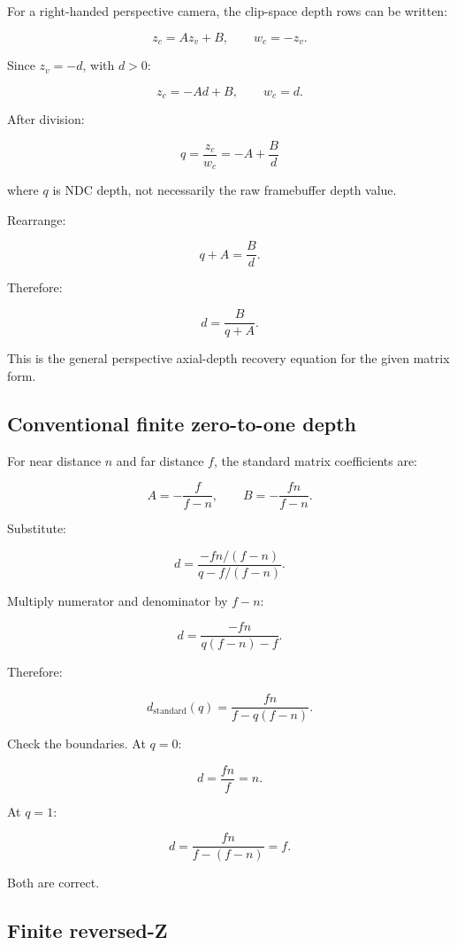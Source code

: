 \hypertarget{02-foundations-ii-ch035-start-from-the-perspective-matrix}{}

For a right-handed perspective camera, the clip-space depth rows can be written:

\[ z_c=Az_v+B, \qquad w_c=-z_v. \]

Since \(z_v=-d\), with \(d>0\):

\[ z_c=-Ad+B, \qquad w_c=d. \]

After division:

\[ \boxed{ q=\frac{z_c}{w_c}=-A+\frac Bd } \]

where \(q\) is NDC depth, not necessarily the raw framebuffer depth value.

Rearrange:

\[ q+A=\frac Bd. \]

Therefore:

\[ \boxed{ d=\frac B{q+A}. } \]

This is the general perspective axial-depth recovery equation for the given matrix form.

\subsection{Conventional finite zero-to-one depth}\label{02-foundations-ii-ch035-conventional-finite-zero-to-one-depth}

\hypertarget{02-foundations-ii-ch035-conventional-finite-zero-to-one-depth}{}

For near distance \(n\) and far distance \(f\), the standard matrix coefficients are:

\[ A=-\frac f{f-n}, \qquad B=-\frac{fn}{f-n}. \]

Substitute:

\[ d= \frac{-fn/(f-n)} {q-f/(f-n)}. \]

Multiply numerator and denominator by \(f-n\):

\[ d=\frac{-fn}{q(f-n)-f}. \]

Therefore:

\[ \boxed{ d_{\mathrm{standard}}(q) = \frac{fn}{f-q(f-n)}. } \]

Check the boundaries. At \(q=0\):

\[ d=\frac{fn}{f}=n. \]

At \(q=1\):

\[ d=\frac{fn}{f-(f-n)}=f. \]

Both are correct.

\subsection{Finite reversed-Z}\label{02-foundations-ii-ch035-finite-reversed-z}

